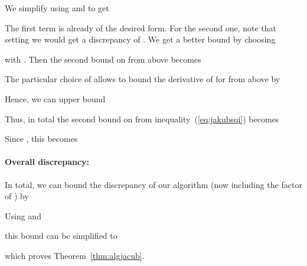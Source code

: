 {We simplify using  and  to get

The first term is already of the desired form. For the second one, note that setting  we would get a discrepancy of . We get a better bound by choosing

with .
Then the second bound on  from above becomes

The particular choice of  allows to bound the derivative of  for  from above by 

Hence, we can upper bound 

Thus, in total the second bound on  from inequality~(\ref{eq:jakubsqi}) becomes 

Since , this becomes 


\paragraph{Overall discrepancy:} 
In total, we can bound the discrepancy  of our algorithm (now including the factor of ) by

Using  and 

this bound can be simplified to

which proves Theorem~\ref{thm:algjacub}.
}
